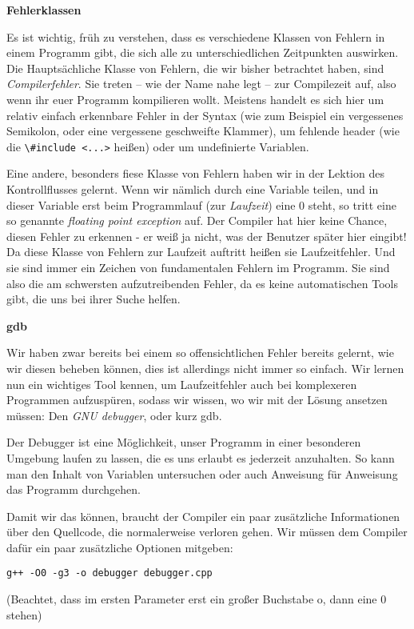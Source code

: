 
\textbf{Fehlerklassen}

Es ist wichtig, früh zu verstehen, dass es verschiedene Klassen von Fehlern in
einem \Cpp Programm gibt, die sich alle zu unterschiedlichen Zeitpunkten
auswirken. Die Hauptsächliche Klasse von Fehlern, die wir bisher betrachtet
haben, sind \emph{Compilerfehler}. Sie treten -- wie der Name nahe legt -- zur
Compilezeit auf, also wenn ihr euer Programm kompilieren wollt. Meistens
handelt es sich hier um relativ einfach erkennbare Fehler in der Syntax (wie
zum Beispiel ein vergessenes Semikolon, oder eine vergessene geschweifte
Klammer), um fehlende header (wie die \verb|\#include <...>| heißen) oder um
undefinierte Variablen.

Eine andere, besonders fiese Klasse von Fehlern haben wir in der Lektion des Kontrollflusses gelernt.
Wenn wir nämlich durch eine Variable teilen, und in
dieser Variable erst beim Programmlauf (zur \emph{Laufzeit}) eine 0 steht, so
tritt eine so genannte \emph{floating point exception} auf. Der Compiler hat
hier keine Chance, diesen Fehler zu erkennen - er weiß ja nicht, was der
Benutzer später hier eingibt! Da diese Klasse von Fehlern zur Laufzeit auftritt
heißen sie Laufzeitfehler. Und sie sind immer ein Zeichen von fundamentalen
Fehlern im Programm. Sie sind also die am schwersten aufzutreibenden Fehler, da
es keine automatischen Tools gibt, die uns bei ihrer Suche helfen.

\textbf{gdb}

Wir haben zwar bereits bei einem so offensichtlichen Fehler bereits gelernt,
wie wir diesen beheben können, dies ist allerdings nicht immer so einfach.
Wir lernen nun ein wichtiges Tool kennen, um Laufzeitfehler auch bei komplexeren Programmen
aufzuspüren, sodass wir wissen, wo wir mit der Lösung
ansetzen müssen: Den \emph{GNU debugger}, oder kurz gdb.

Der Debugger ist eine Möglichkeit, unser Programm in einer besonderen Umgebung
laufen zu lassen, die es uns erlaubt es jederzeit anzuhalten. So kann man den Inhalt von
Variablen untersuchen oder auch Anweisung für Anweisung das Programm durchgehen.

Damit wir das können, braucht der Compiler ein paar zusätzliche
Informationen über den Quellcode, die normalerweise verloren gehen. Wir müssen
dem Compiler dafür ein paar zusätzliche Optionen mitgeben:
\begin{verbatim}
g++ -O0 -g3 -o debugger debugger.cpp
\end{verbatim}
(Beachtet, dass im ersten Parameter erst ein großer Buchstabe o, dann eine 0 stehen)

